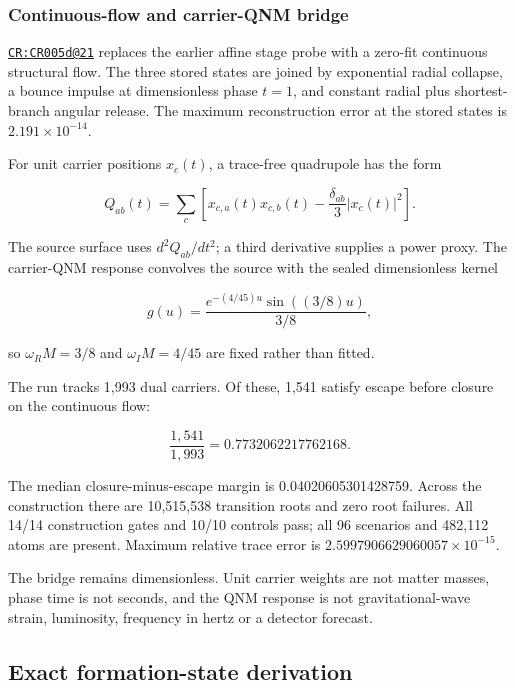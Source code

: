 \subsubsection{Continuous-flow and carrier-QNM
bridge}\label{viii-ch08-continuous-flow-and-carrier-qnm-bridge}

\href{https://github.com/iwtbotiwtwot/SAMA/blob/4c2b5dc1649da5900c90b90d0ce56c223dbb7717/tests/courtroom/21-gravitational-waves-cr005d-starbreaker-continuous-flow-and-carrier-qnm-source-bridge/README.md}{\texttt{CR:CR005d@21}}
replaces the earlier affine stage probe with a zero-fit continuous
structural flow. The three stored states are joined by exponential
radial collapse, a bounce impulse at dimensionless phase \(t=1\), and
constant radial plus shortest-branch angular release. The maximum
reconstruction error at the stored states is \(2.191\times10^{-14}\).

For unit carrier positions \(x_c(t)\), a trace-free quadrupole has the
form

\[
Q_{ab}(t)=\sum_c\left[x_{c,a}(t)x_{c,b}(t)
-\frac{\delta_{ab}}{3}|x_c(t)|^2\right].
\]

The source surface uses \(d^2Q_{ab}/dt^2\); a third derivative supplies
a power proxy. The carrier-QNM response convolves the source with the
sealed dimensionless kernel

\[
g(u)=\frac{e^{-(4/45)u}\sin((3/8)u)}{3/8},
\]

so \(\omega_RM=3/8\) and \(\omega_IM=4/45\) are fixed rather than
fitted.

The run tracks 1,993 dual carriers. Of these, 1,541 satisfy escape
before closure on the continuous flow:

\[
\frac{1{,}541}{1{,}993}=0.7732062217762168.
\]

The median closure-minus-escape margin is 0.04020605301428759. Across
the construction there are 10,515,538 transition roots and zero root
failures. All 14/14 construction gates and 10/10 controls pass; all 96
scenarios and 482,112 atoms are present. Maximum relative trace error is
\(2.5997906629060057\times10^{-15}\).

The bridge remains dimensionless. Unit carrier weights are not matter
masses, phase time is not seconds, and the QNM response is not
gravitational-wave strain, luminosity, frequency in hertz or a detector
forecast.

\subsection{Exact formation-state
derivation}\label{viii-ch08-exact-formation-state-derivation}

